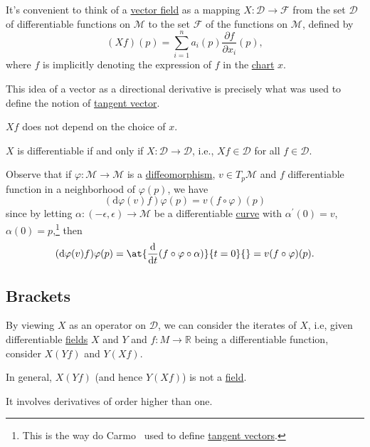 It's convenient to think of a \hyperref[def:vector-field]{vector field} as a mapping \(X\colon \mathcal{D} \to \mathcal{F} \) from the set \(\mathcal{D} \) of differentiable functions on \(\mathcal{M} \) to the set \(\mathcal{F} \) of the functions on \(\mathcal{M} \), defined by
\[
	(Xf)(p) = \sum_{i=1}^{n} a_i(p)\frac{\partial f}{\partial x_i} (p),
\]
where \(f\) is implicitly denoting the expression of \(f\) in the \hyperref[def:coordinate-chart]{chart} \(x\).

\begin{intuition}
	This idea of a vector as a directional derivative is precisely what was used to define the notion of \hyperref[def:tangent-vector]{tangent vector}.
\end{intuition}

\begin{remark}
	\(Xf\) does not depend on the choice of \(x\).
\end{remark}

\begin{remark}
	\(X\) is differentiable if and only if \(X\colon \mathcal{D} \to \mathcal{D} \), i.e., \(Xf\in \mathcal{D} \) for all \(f\in \mathcal{D} \).
\end{remark}

Observe that if \(\varphi \colon \mathcal{M} \to \mathcal{M} \) is a \hyperref[def:diffeomorphism]{diffeomorphism}, \(v\in T_p \mathcal{M} \)  and \(f\) differentiable function in a neighborhood of \(\varphi (p)\), we have
\[
	(\mathrm{d} \varphi (v)f)\varphi (p) = v(f\circ \varphi )(p)
\]
since by letting \(\alpha \colon (-\epsilon , \epsilon ) \to \mathcal{M} \) be a differentiable \hyperref[def:curve]{curve} with \(\alpha ^\prime (0) = v\), \(\alpha (0)= p\),\footnote{This is the way do Carmo~\cite{flaherty2013riemannian} used to define \hyperref[def:tangent-vector]{tangent vectors}.} then
\[
	(\mathrm{d} \varphi (v) f) \varphi (p) = \at{\frac{\mathrm{d}}{\mathrm{d}t} (f \circ \varphi \circ \alpha )}{t=0}{} = v(f \circ \varphi )(p).
\]

\subsection{Brackets}
By viewing \(X\) as an operator on \(\mathcal{D} \), we can consider the iterates of \(X\), i.e, given differentiable \hyperref[def:vector-field]{fields} \(X\) and \(Y\) and \(f\colon M \to \mathbb{R} \) being a differentiable function, consider \(X(Y f)\) and \(Y(X f)\).

\begin{note}
	In general, \(X(Y f)\) (and hence \(Y(X f)\)) is not a \hyperref[def:vector-field]{field}.
\end{note}
\begin{explanation}
	It involves derivatives of order higher than one.
\end{explanation}

